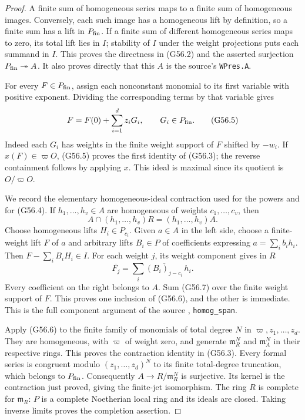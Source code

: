\begin{proof}
A finite sum of homogeneous series maps to a finite
sum of homogeneous images.  Conversely, each such
image has a homogeneous lift by definition, so a
finite sum has a lift in $P_{\rm fin}$.
If a finite sum of different homogeneous series
maps to zero, its total lift lies in $I$; stability
of $I$ under the weight projections puts each
summand in $I$.  This proves the directness in
(G56.2) and the asserted surjection
$P_{\rm fin}\twoheadrightarrow A$.
It also proves directly that this $A$ is the source's
\texttt{WPres.A}.

For every $F\in P_{\rm fin}$, assign each nonconstant
monomial to its first variable with positive
exponent.  Dividing the corresponding terms by that
variable gives
\[
                F=F(0)+\sum_{i=1}^d z_iG_i,
                   \qquad G_i\in P_{\rm fin}.
                                                               \tag{G56.5}
\]
Indeed each $G_i$ has weights in the finite weight
support of $F$ shifted by $-w_i$.
If $x(F)\in\varpi O$, (G56.5) proves the first
identity of (G56.3); the reverse containment follows
by applying $x$.  This ideal is maximal since its
quotient is $O/\varpi O$.

We record the elementary homogeneous-ideal
contraction used for the powers and for (G56.4).
If $h_1,\ldots,h_v\in A$ are homogeneous of weights
$c_1,\ldots,c_v$, then
\[
          A\cap(h_1,\ldots,h_v)R=(h_1,\ldots,h_v)A .
                                                               \tag{G56.6}
\]
Choose homogeneous lifts $H_i\in P_{c_i}$.
Given $a\in A$ in the left side, choose a finite-weight
lift $F$ of $a$ and arbitrary lifts $B_i\in P$ of
coefficients expressing $a=\sum_i b_ih_i$.
Then $F-\sum_iB_iH_i\in I$.
For each weight $j$, its weight component gives in
$R$
\[
       \overline{F_j}
          =\sum_i\overline{(B_i)_{j-c_i}}\,h_i .
                                                               \tag{G56.7}
\]
Every coefficient on the right belongs to $A$.
Sum (G56.7) over the finite weight support of $F$.
This proves one inclusion of (G56.6), and the other
is immediate.  This is the full component argument
of the source
,
\texttt{homog\_span}.

Apply (G56.6) to the finite family of monomials of
total degree $N$ in $\varpi,z_1,\ldots,z_d$.
They are homogeneous, with $\varpi$ of weight zero,
and generate $\mathfrak m_R^N$ and
$\mathfrak m_A^N$ in their respective rings.
This proves the contraction identity in (G56.3).
Every formal series is congruent modulo
$(z_1,\ldots,z_d)^N$ to its finite total-degree
truncation, which belongs to $P_{\rm fin}$.
Consequently $A\to R/\mathfrak m_R^N$ is surjective.
Its kernel is the contraction just proved, giving
the finite-jet isomorphism.
The ring $R$ is complete for $\mathfrak m_R$:
$P$ is a complete Noetherian local ring and its
ideals are closed.  Taking inverse limits proves
the completion assertion.


\end{proof}
